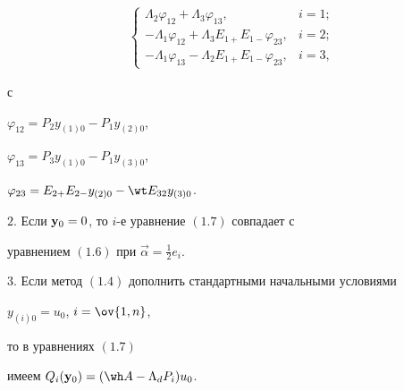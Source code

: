 \begin{thm}
\begin{align*}
\begin{cases}


\Lambda_2\varphi_{12}+\Lambda_3\varphi_{13},& i=1;\\


-\Lambda_1\varphi_{12}+\Lambda_3E_{1+}E_{1-}\varphi_{23},& i=2;\\


-\Lambda_1\varphi_{13}-\Lambda_2E_{1+}E_{1-}\varphi_{23},& i=3,


\end{cases}


\end{align*}


с


$\varphi_{12}=P_2y_{(1)0}-P_1y_{(2)0}$,


$\varphi_{13}=P_3y_{(1)0}-P_1y_{(3)0}$,


$\varphi_{23}=E_{2+}E_{2-}y_{(2)0}-\wt E_{32}y_{(3)0}$.





$2.$ Если ${\bold y}_0=0$, то $i$-е уравнение $(1.7)$ совпадает с 


уравнением $(1.6)$ при ${\Vec\alpha}=\frac{1}{2}e_i$.





$3.$ Если метод $(1.4)$ дополнить стандартными начальными условиями


$y_{(i)0}=u_0$, $i=\ov{1,n}$, 


то  в уравнениях $(1.7)$


имеем $Q_i(\bold y_0)=(\wh A -\Lambda_d P_i)u_0$.


\end{thm}





